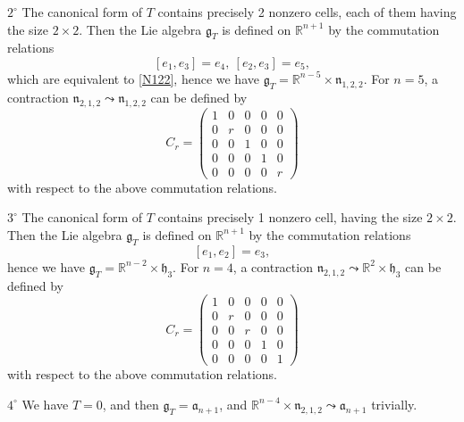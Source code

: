 \documentclass[
reqno]{amsart}
\begin{document}
\begin{itemize}
\smallbreak 

$2^\circ$ The canonical form of $T$ contains precisely 2 nonzero cells, 
each of them having the size $2\times 2$. 
Then the Lie algebra ${{\mathfrak g}}_T$ is defined on ${{\mathbb R}}^{n+1}$ by the commutation relations 
$$[e_1,e_3]=e_4,\ [e_2,e_3]=e_5,$$
which are equivalent to \eqref{N122}, 
hence we have ${{\mathfrak g}}_T={{\mathbb R}}^{n-5}\times{{\mathfrak n}}_{1,2,2}$. 
For $n=5$, a contraction ${{\mathfrak n}}_{2,1,2} {\leadsto} {{\mathfrak n}}_{1,2,2}$ 
can be defined by 
$$C_r=\begin{pmatrix}
1 & 0 & 0   & 0   & 0  \\
0 & r & 0   & 0   & 0  \\
0 & 0 & 1   & 0   & 0  \\
0 & 0 & 0   & 1   & 0  \\
0 & 0 & 0   & 0   & r  
\end{pmatrix}$$with respect to the above commutation relations. 

\smallbreak 

$3^\circ$ The canonical form of $T$ contains precisely 1 nonzero cell, 
 having the size $2\times 2$. 
Then the Lie algebra ${{\mathfrak g}}_T$ is defined on ${{\mathbb R}}^{n+1}$ by the commutation relations 
$$[e_1,e_2]=e_3,$$
hence we have ${{\mathfrak g}}_T={{\mathbb R}}^{n-2}\times {{\mathfrak h}}_3$. 
For $n=4$, a contraction ${{\mathfrak n}}_{2,1,2} {\leadsto} {{\mathbb R}}^2\times{{\mathfrak h}}_3$ 
can be defined by 
$$C_r=\begin{pmatrix}
1 & 0 & 0   & 0   & 0  \\
0 & r & 0   & 0   & 0  \\
0 & 0 & r   & 0   & 0  \\
0 & 0 & 0   & 1   & 0  \\
0 & 0 & 0   & 0   & 1  
\end{pmatrix}$$
with respect to the above commutation relations. 

\smallbreak 

$4^\circ$ We have $T=0$, and then ${{\mathfrak g}}_T={{\mathfrak a}}_{n+1}$, and  
${{\mathbb R}}^{n-4}\times{{\mathfrak n}}_{2,1,2} {\leadsto}{{\mathfrak a}}_{n+1}$ trivially. 
\end{itemize}
\end{document}
